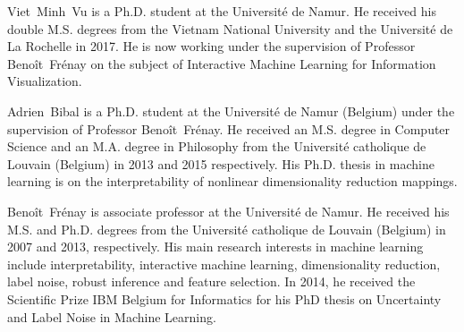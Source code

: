 Viet~Minh~Vu is a Ph.D. student at the Universit\'{e} de Namur.
He received his double M.S. degrees from the Vietnam National University and the Universit\'{e} de La Rochelle in 2017.
He is now working under the supervision of Professor {Beno\^{i}t~Fr\'{e}nay} on the subject of Interactive Machine Learning for Information Visualization.
\endbio

Adrien~Bibal is a Ph.D. student at the Universit\'{e} de Namur (Belgium) under the supervision of Professor {Beno\^{i}t~Fr\'{e}nay}. He received an M.S. degree in Computer Science and an M.A. degree in Philosophy from the Universit\'{e} catholique de Louvain (Belgium) in 2013 and 2015 respectively. His Ph.D. thesis in machine learning is on the interpretability of nonlinear dimensionality reduction mappings.
\endbio

Beno\^{i}t~Fr\'{e}nay is associate professor at the Universit\'{e} de Namur.  He received his M.S. and Ph.D. degrees from the Universit\'{e} catholique de Louvain (Belgium) in 2007 and 2013, respectively. His main research interests in machine learning include interpretability, interactive machine learning, dimensionality reduction, label noise, robust inference and feature selection. In 2014, he received the Scientific Prize IBM Belgium for Informatics for his PhD thesis on Uncertainty and Label Noise in Machine Learning.
\endbio
